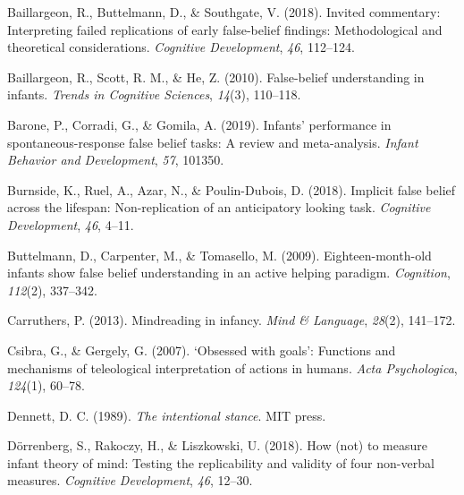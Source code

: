 \documentclass[
  english,
  man,floatsintext]{apa6}
\newlength{\cslhangindent}
\newlength{\cslentryspacingunit} %
\newenvironment{CSLReferences}[2] %
 {%
  \setlength{\parindent}{0pt}
  \ifodd #1
  \let\oldpar\par
  \def\par{\hangindent=\cslhangindent\oldpar}
  \fi
  \setlength{\parskip}{#2\cslentryspacingunit}
 }%
 {}
\begin{document}
\hypertarget{refs}{}
\begin{CSLReferences}{1}{0}
\leavevmode{}%
Baillargeon, R., Buttelmann, D., \& Southgate, V. (2018). Invited commentary: Interpreting failed replications of early false-belief findings: Methodological and theoretical considerations. \emph{Cognitive Development}, \emph{46}, 112--124.

\leavevmode{}%
Baillargeon, R., Scott, R. M., \& He, Z. (2010). False-belief understanding in infants. \emph{Trends in Cognitive Sciences}, \emph{14}(3), 110--118.

\leavevmode{}%
Barone, P., Corradi, G., \& Gomila, A. (2019). Infants' performance in spontaneous-response false belief tasks: A review and meta-analysis. \emph{Infant Behavior and Development}, \emph{57}, 101350.

\leavevmode{}%
Burnside, K., Ruel, A., Azar, N., \& Poulin-Dubois, D. (2018). Implicit false belief across the lifespan: Non-replication of an anticipatory looking task. \emph{Cognitive Development}, \emph{46}, 4--11.

\leavevmode{}%
Buttelmann, D., Carpenter, M., \& Tomasello, M. (2009). Eighteen-month-old infants show false belief understanding in an active helping paradigm. \emph{Cognition}, \emph{112}(2), 337--342.

\leavevmode{}%
Carruthers, P. (2013). Mindreading in infancy. \emph{Mind \& Language}, \emph{28}(2), 141--172.

\leavevmode{}%
Csibra, G., \& Gergely, G. (2007). {`Obsessed with goals'}: Functions and mechanisms of teleological interpretation of actions in humans. \emph{Acta Psychologica}, \emph{124}(1), 60--78.

\leavevmode{}%
Dennett, D. C. (1989). \emph{The intentional stance}. MIT press.

\leavevmode{}%
Dörrenberg, S., Rakoczy, H., \& Liszkowski, U. (2018). How (not) to measure infant theory of mind: Testing the replicability and validity of four non-verbal measures. \emph{Cognitive Development}, \emph{46}, 12--30.


\end{CSLReferences}
\end{document}
